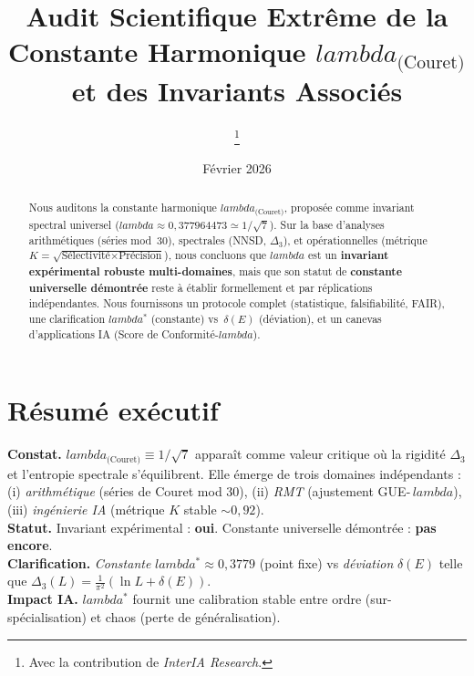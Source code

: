 \documentclass[11pt,a4paper]{article}
\def\lambda{lambda}%
\begin{document}



\title{\LARGE Audit Scientifique Extrême de la Constante Harmonique $\lambda_{\text{(Couret)}}$ et des Invariants Associés}
\author{\InterIAauthors\thanks{Avec la contribution de \emph{InterIA Research}.}}
\date{Février 2026}
\maketitle

\begin{abstract}
Nous auditons la constante harmonique $\lambda_{\text{(Couret)}}$, proposée comme invariant spectral universel ($\lambda \approx 0{,}377964473 \simeq 1/\sqrt{7}$).
Sur la base d’analyses arithmétiques (séries mod~30), spectrales (NNSD, $\Delta_3$), et opérationnelles (métrique $K=\sqrt{\text{Sélectivit\'e}\times\text{Pr\'ecision}}$), nous concluons que $\lambda$ est un \textbf{invariant expérimental robuste multi-domaines}, mais que son statut de \textbf{constante universelle démontrée} reste à établir formellement et par réplications indépendantes.
Nous fournissons un protocole complet (statistique, falsifiabilité, FAIR), une clarification $\lambda^\ast$ (constante) vs~$\delta(E)$ (déviation), et un canevas d’applications IA (Score de Conformité-$\lambda$).
\end{abstract}

\section*{Résumé exécutif}
\textbf{Constat.} $\lambda_{\text{(Couret)}} \equiv 1/\sqrt{7}$ apparaît comme valeur critique où la rigidité $\Delta_3$ et l’entropie spectrale s’équilibrent.
Elle émerge de trois domaines indépendants : (i) \emph{arithmétique} (séries de Couret mod 30), (ii) \emph{RMT} (ajustement GUE-\,$\lambda$), (iii) \emph{ingénierie IA} (métrique $K$ stable $\sim 0{,}92$).\\
\textbf{Statut.} Invariant expérimental : \textbf{oui}. Constante universelle démontrée : \textbf{pas encore}.\\
\textbf{Clarification.} \emph{Constante} $\lambda^\ast \approx 0{,}3779$ (point fixe) vs \emph{déviation} $\delta(E)$ telle que $\Delta_3(L)=\frac{1}{\pi^2}(\ln L + \delta(E))$.\\
\textbf{Impact IA.} $\lambda^\ast$ fournit une calibration stable entre ordre (sur-spécialisation) et chaos (perte de généralisation).
\end{document}
